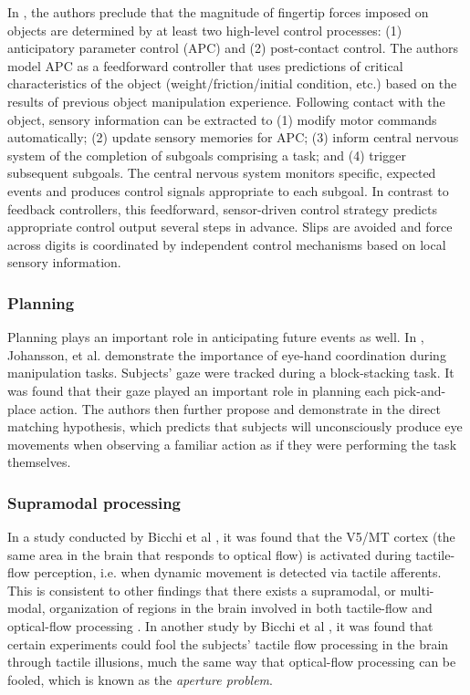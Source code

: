 In \cite{johansson1994grasp}, the authors preclude that the magnitude of fingertip forces imposed on objects are determined by at least two high-level control processes: (1) anticipatory parameter control (APC) and (2) post-contact control.
The authors model APC as a feedforward controller that uses predictions of critical characteristics of the object (weight/friction/initial condition, etc.) based on the results of previous object manipulation experience.
Following contact with the object, sensory information can be extracted to (1) modify motor commands automatically; (2) update sensory memories for APC; (3) inform central nervous system of the completion of subgoals comprising a task; and (4) trigger subsequent subgoals.
The central nervous system monitors specific, expected events and produces control signals appropriate to each subgoal.
In contrast to feedback controllers, this feedforward, sensor-driven control strategy predicts appropriate control output several steps in advance.
Slips are avoided and force across digits is coordinated by independent control mechanisms based on local sensory information.

\subsubsection*{Planning}

Planning plays an important role in anticipating future events as well.
In \cite{johansson2001eye}, Johansson, et al. demonstrate the importance of eye-hand coordination during manipulation tasks.
Subjects' gaze were tracked during a block-stacking task.
It was found that their gaze played an important role in planning each pick-and-place action.
The authors then further propose and demonstrate in \cite{flanagan2003action} the direct matching hypothesis, which predicts that subjects will unconsciously produce eye movements when observing a familiar action as if they were performing the task themselves.

\subsubsection*{Supramodal processing}

In a study conducted by Bicchi et al \cite{scilingo2004perception}, it was found that the V5/MT cortex (the same area in the brain that responds to optical flow) is activated during tactile-flow perception, i.e. when dynamic movement is detected via tactile afferents.
This is consistent to other findings that there exists a supramodal, or multi-modal, organization of regions in the brain involved in both tactile-flow and optical-flow processing \cite{flanagan2006control}.
In another study by Bicchi et al \cite{bicchi2003haptic}, it was found that certain experiments could fool the subjects' tactile flow processing in the brain through tactile illusions, much the same way that optical-flow processing can be fooled, which is known as the \emph{aperture problem}.

